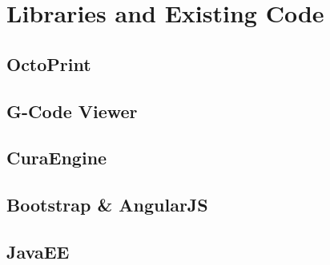 \chapter{Libraries and Existing Code}

\section{OctoPrint}
\section{G-Code Viewer}
\section{CuraEngine}
\section{Bootstrap & AngularJS}
\section{JavaEE}
